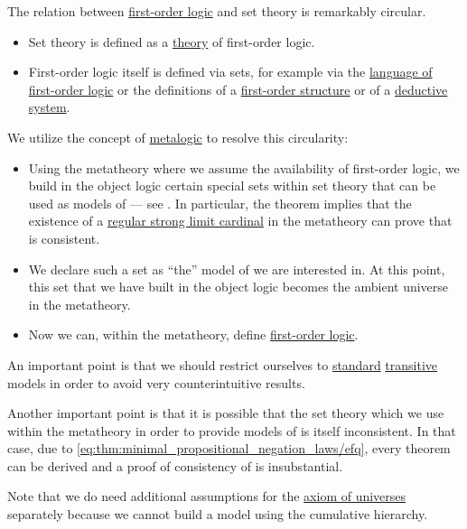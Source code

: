 \begin{remark}\label{rem:set_definition_recursion}
  The relation between \hyperref[subsec:first_order_logic]{first-order logic} and set theory is remarkably circular.

  \begin{itemize}
    \item Set theory is defined as a \hyperref[def:first_order_theory]{theory} of first-order logic.

    \item First-order logic itself is defined via sets, for example via the \hyperref[def:first_order_language]{language of first-order logic} or the definitions of a \hyperref[def:first_order_structure]{first-order structure} or of a \hyperref[def:deductive_system]{deductive system}.
  \end{itemize}

  We utilize the concept of \hyperref[rem:metalogic]{metalogic} to resolve this circularity:
  \begin{itemize}
    \item Using the metatheory where we assume the availability of first-order logic, we build in the object logic certain special sets within set theory that can be used as models of  --- see . In particular, the theorem implies that the existence of a \hyperref[rem:strongly_inaccessible_cardinal]{regular strong limit cardinal} in the metatheory can prove that  is consistent.

    \item We declare such a set as \enquote{the} model of  we are interested in. At this point, this set that we have built in the object logic becomes the ambient universe in the metatheory.

    \item Now we can, within the metatheory, define \hyperref[subsec:first_order_logic]{first-order logic}.
  \end{itemize}

  An important point is that we should restrict ourselves to \hyperref[rem:standard_model_of_set_theory]{standard} \hyperref[rem:transitive_model_of_set_theory]{transitive} models in order to avoid very counterintuitive results.

  Another important point is that it is possible that the set theory which we use within the metatheory in order to provide models of  is itself inconsistent. In that case, due to \eqref{eq:thm:minimal_propositional_negation_laws/efq}, every theorem can be derived and a proof of consistency of  is insubstantial.

  Note that we do need additional assumptions for the \hyperref[def:axiom_of_universes]{axiom of universes} separately because we cannot build a model using the cumulative hierarchy.
\end{remark}

